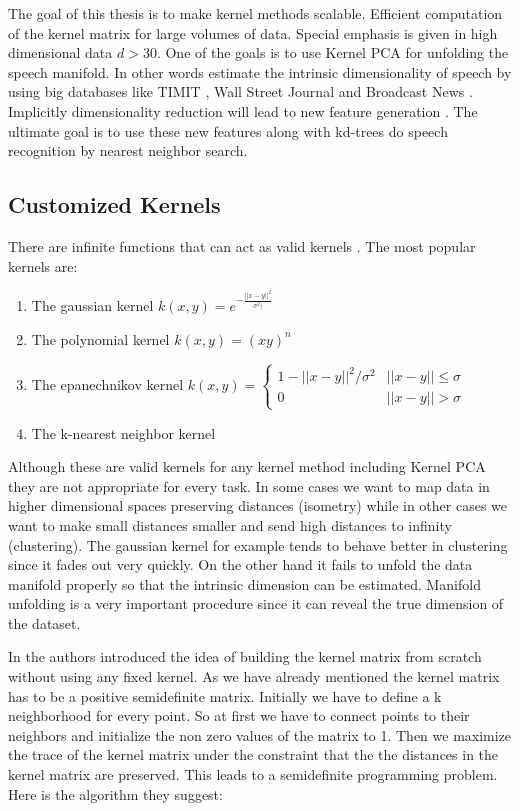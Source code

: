 \documentclass[12pt,letterpaper,doublespaced,ETD,dvips,proposal]{gtthesis}
\begin{document}
\begin{Body}
The goal of this thesis is to make kernel methods scalable.
Efficient computation of the kernel matrix for large volumes of
data. Special emphasis is given in high dimensional data $d>30$. One
of the goals is to use Kernel PCA for unfolding the speech manifold.
In other words estimate the intrinsic dimensionality of speech by
using big databases like TIMIT \cite{garofolo1993tap}, Wall Street Journal and Broadcast
News \cite{graff1997bns}. Implicitly dimensionality reduction will lead to new feature
generation . The ultimate goal is to use these new features along
with kd-trees do speech recognition by nearest neighbor search.

\subsection{Customized Kernels}
There are infinite functions
that can act as valid kernels \cite{shawetaylor2004kmp}. The most popular kernels are:
\begin{enumerate}
  \item The gaussian kernel $k(x, y)=e^{-\frac{||x-y||^2}{\sigma^2)}}$
  \item The polynomial kernel $k(x, y)=(xy)^n$
  \item The epanechnikov kernel $k(x, y)=\left\{ \begin{array}{cc}
                                                  1-||x-y||^2/\sigma^2 & ||x-y||\leq\sigma \\
                                                  0                    & ||x-y||>\sigma 
                                                \end{array} \right.$
  \item The k-nearest neighbor kernel
\end{enumerate}

Although these are valid kernels for any kernel method including
Kernel PCA they are not appropriate for every task. In some cases we
want to map data in higher dimensional spaces preserving distances
(isometry) while in other cases we want to make small distances
smaller and send high distances to infinity (clustering). The
gaussian kernel for example tends to behave better in clustering
since it fades out very quickly. On the other hand it fails to
unfold the data manifold properly so that the intrinsic dimension
can be estimated. Manifold unfolding is a very important procedure
since it can reveal the true dimension of the dataset.

In \cite{weinberger2004lkm} the authors introduced the idea of building the kernel matrix
from scratch without using any fixed kernel. As we have already
mentioned the kernel matrix has to be a positive semidefinite
matrix. Initially we have to define a k neighborhood  for every
point. So at first we have to connect points to their neighbors and
 initialize the non zero values of the matrix to 1. Then we
maximize the trace of the kernel matrix under the constraint that
the the distances in the kernel matrix are preserved. This leads to
a semidefinite programming problem. Here is the algorithm they
suggest:


\end{Body}
\end{document}
